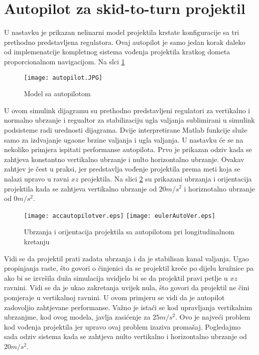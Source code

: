\section{Autopilot za skid-to-turn projektil}
U nastavku je prikazan nelinarni model projektila krstate konfiguracije sa tri 
prethodno predstavljena regulatora. Ovaj autopilot je samo jedan korak daleko od
implemenatcije kompletnog sistema vođenja projektila kratkog dometa proporcionalnom
navigacijom. Na slci \ref{fig:autopilot3}
\begin{figure}[!ht]
    \centering
    \texttt{[image: autopilot.JPG]}
    \caption{Model sa autopilotom}
    \label{fig:autopilot3}
\end{figure}
U ovom simulink dijagramu su prethodno predstavljeni regulatori za vertikalno i normalno ubrzanje i 
regualtor za stabilizaciju ugla valjanja sublimirani u simulink podsisteme radi 
urednosti dijagrama. Dvije interpretirane Matlab funkcije služe samo za izdvajanje ugaone brzine valjanja
i ugla valjanja. U nastavku će se na nekoliko primjera ispitati performanse 
autopilota. Prvo je prikazan odziv kada se zahtjeva konstantno vertikalno ubrzanje i nulto 
horizontalno ubrzanje. Ovakav zahtjev je čest u praksi, jer predstavlja vođenje projektila 
prema meti koja se nalazi upravo u ravni $xz$ projektila. Na slici \ref{fig:accautover} su prikazani 
ubrzanja i orijentacija projektila kada se zahtjeva vertikalno ubrzanje od $20 m/s^2$ i horiznotalno ubrzanje od 
$0m/s^2$.
\begin{figure}[!ht]
    \centering
    \texttt{[image: accautopilotver.eps]}
    \texttt{[image: eulerAutoVer.eps]}
    \caption{Ubrzanja i orijentacija projektila sa autopilotom pri longitudinalnom kretanju}
    \label{fig:accautover}
\end{figure}
Vidi se da projektil prati zadata ubrzanja i da je stabilisan kanal valjanja. Ugao propinjanja raste, 
što govori o činjenici da se projektil kreće po dijelu kružnice pa ako bi se izvršila duža simulacija 
uvidjelo bi se da projektil pravi petlje u $xz$ ravnini. Vidi se da je ukao zakretanja 
uvijek nula, što govori da projektil ne čini pomjeraje u vertikalnoj ravnini. U ovom primjeru se 
vidi da je autopilot zadovoljio zahtjevane performanse. Važno je istaći se kod upravljanja vertikalnim 
ubrzanjme, kod ovog modela, javlja zasićenje za $25m/s^2$. Ovo je najveći problem 
kod vođenja projektila jer upravo ovaj problem izaziva promašaj. 
Pogledajmo sada odziv sistema kada se zahtjeva nulto vertikalno i horizontalno ubrzanje od $20m/s^2$. 
